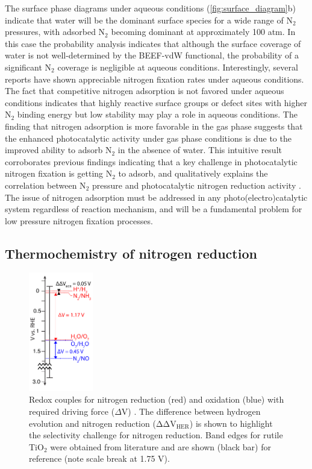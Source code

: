 \documentclass[journal=ascecg,manuscript=article,articletitle=true]{achemso}
\makeatletter
\newcommand{\todobmc}[1]{\todo[color=red]{\@BMC: #1}}
\makeatother
\begin{document}
The surface phase diagrams under aqueous conditions (\ref{fig:surface_diagram}b) indicate that water will be the dominant surface species for a wide range of N$_2$ pressures, with adsorbed N$_2$ becoming dominant at approximately 100 atm. In this case the probability analysis indicates that although the surface coverage of water is not well-determined by the BEEF-vdW functional, the probability of a significant N$_2$ coverage is negligible at aqueous conditions. Interestingly, several reports have shown appreciable nitrogen fixation rates under aqueous conditions. \cite{Augugliaro_1982,Hirakawa_2017} The fact that competitive nitrogen adsorption is not favored under aqueous conditions indicates that highly reactive surface groups or defect sites with higher N$_2$ binding energy but low stability may play a role in aqueous conditions. The finding that nitrogen adsorption is more favorable in the gas phase suggests that the enhanced photocatalytic activity under gas phase conditions is due to the improved ability to adsorb N$_2$ in the absence of water. This intuitive result corroborates previous findings indicating that a key challenge in photocatalytic nitrogen fixation is getting N$_2$ to adsorb\cite{Zhu_2013,Vettraino_2002,Schrauzer_2011}, and qualitatively explains the  correlation between N$_2$ pressure and photocatalytic nitrogen reduction activity \cite{Schrauzer_2011,Ali_2016}. The issue of nitrogen adsorption must be addressed in any photo(electro)catalytic system regardless of reaction mechanism, and will be a fundamental problem for low pressure nitrogen fixation processes.

\subsection{Thermochemistry of nitrogen reduction}

\begin{figure}[h]
\centering

\includegraphics[width=0.25\textwidth]{figures/N2_redox_ladder.pdf}
\caption{Redox couples for nitrogen reduction (red) and oxidation (blue) with required driving force ($\Delta$V) \cite{Medford_2017}. The difference between hydrogen evolution and nitrogen reduction ($\mathrm{\Delta \Delta V_{HER}}$) is shown to highlight the selectivity challenge for nitrogen reduction. Band edges for rutile TiO$_2$ were obtained from literature \cite{Nozik_1996}  and are shown (black bar) for reference (note scale break at 1.75 V).}
\label{fig:redox_ladder}
\end{figure}
\todobmc{double check the reference for the band edges}
\end{document}
